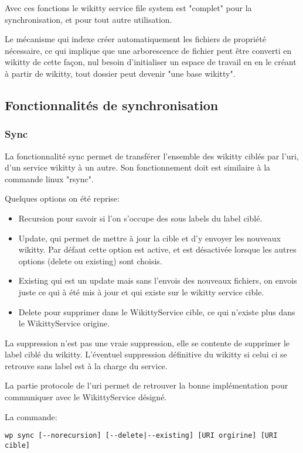 Avec ces fonctions le wikitty service file system est "complet" pour la
synchronisation, et pour tout autre utilisation.

Le mécanisme qui indexe créer automatiquement les fichiers de propriété
nécessaire, ce qui implique que une arborescence de fichier peut être converti
en wikitty de cette façon, nul besoin d'initialiser un espace de travail en en
le créant à partir de wikitty, tout dossier peut devenir "une base wikitty".

\subsection{Fonctionnalités de synchronisation}

\subsubsection{Sync}

La fonctionnalité sync permet de transférer l'ensemble des wikitty ciblés par 
l'uri, d'un service wikitty à un autre. Son fonctionnement doit est similaire à
la commande linux "rsync".

Quelques options on été reprise:
\begin{itemize}
\item Recursion pour savoir si l'on s'occupe des sous labels du label ciblé.
\item Update, qui permet de mettre à jour la cible et d'y envoyer les nouveaux 
wikitty. Par défaut cette option est active, et est désactivée lorsque 
les autres options (delete ou existing) sont choisis.
\item Existing qui est un update mais sans l'envois des nouveaux fichiers, on
envois juste ce qui à été mis à jour et qui existe sur le wikitty service cible.
\item Delete pour supprimer dans le WikittyService cible, ce qui n'existe plus
dans le WikittyService origine.
\end{itemize}

La suppression n'est pas une vraie suppression, elle se contente de supprimer le 
label ciblé du wikitty. L'éventuel suppression définitive du wikitty si celui ci
se retrouve sans label est à la charge du service.

La partie protocole de l'uri permet de retrouver la bonne implémentation pour 
communiquer avec le WikittyService désigné.

La commande:

\verb!wp sync [--norecursion] [--delete|--existing] [URI orgirine] [URI cible]!

